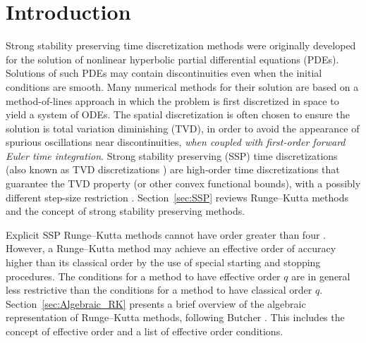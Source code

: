 \section{Introduction}\label{sec:Intro}
Strong stability preserving time discretization methods were originally
developed for the solution of nonlinear hyperbolic 
partial differential equations (PDEs).  Solutions of such PDEs may 
contain discontinuities even when the initial conditions are smooth.
Many numerical methods for their solution are based on a method-of-lines approach 
in which the problem is first discretized in space to yield a system of ODEs. 
The spatial discretization is often chosen to ensure the solution is total variation diminishing (TVD),
in order to avoid the appearance of spurious oscillations near discontinuities,
\emph{when coupled with first-order forward Euler time integration}.
Strong stability preserving (SSP) time discretizations (also known as TVD
discretizations \cite{Gottlieb/Shu:1998}) are high-order time
discretizations that guarantee the TVD property (or other convex functional bounds), with a
possibly different step-size restriction \cite{Gottlieb2011a}.
Section~\ref{sec:SSP} reviews Runge--Kutta methods and the concept of
strong stability preserving methods.

Explicit SSP Runge--Kutta methods cannot have order greater
than four \cite{Ruuth2002}.  However, a Runge--Kutta method may 
achieve an effective order of accuracy higher than its classical order 
by the use of special starting and stopping procedures.
The conditions for a method to have effective order $q$ are 
in general less restrictive than the conditions for a method
to have classical order $q$.
Section~\ref{sec:Algebraic_RK} presents a brief overview of the
algebraic representation of Runge--Kutta methods, following Butcher
\cite{Butcher2008_book}.
This includes the concept of effective order and a list of effective
order conditions.

